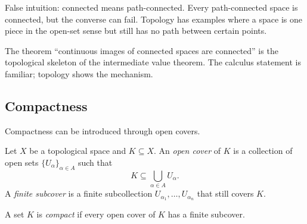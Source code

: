 \begin{center}
\end{center}

\begin{trapbox}
False intuition: connected means path-connected. Every path-connected space is
connected, but the converse can fail. Topology has examples where a space is
one piece in the open-set sense but still has no path between certain points.
\end{trapbox}

\begin{marginnotebox}
The theorem ``continuous images of connected spaces are connected'' is the
topological skeleton of the intermediate value theorem. The calculus statement
is familiar; topology shows the mechanism.
\end{marginnotebox}

\subsection{Compactness}

Compactness can be introduced through open covers.

\begin{definition}
Let $X$ be a topological space and $K\subseteq X$. An \emph{open cover} of $K$
is a collection of open sets $\{U_\alpha\}_{\alpha\in A}$ such that
\[
K\subseteq \bigcup_{\alpha\in A}U_\alpha.
\]
A \emph{finite subcover} is a finite subcollection
$U_{\alpha_1},\ldots,U_{\alpha_n}$ that still covers $K$.
\end{definition}

\begin{definition}
A set $K$ is \emph{compact} if every open cover of $K$ has a finite subcover.
\end{definition}

